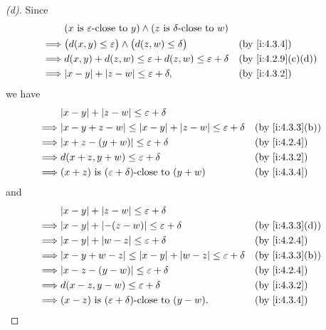 \begin{proof}[(d)]
  Since
  \begin{align*}
             & (x \text{ is \(\varepsilon\)-close to } y) \land (z \text{ is \(\delta\)-close to } w)                        \\
    \implies & \big(d(x, y) \leq \varepsilon\big) \land \big(d(z, w) \leq \delta\big)                 &  & \by{i:4.3.4}      \\
    \implies & d(x, y) + d(z, w) \leq \varepsilon + d(z, w) \leq \varepsilon + \delta                 &  & \by{i:4.2.9}[c,d] \\
    \implies & \abs{x - y} + \abs{z - w} \leq \varepsilon + \delta,                                   &  & \by{i:4.3.2}
  \end{align*}
  we have
  \begin{align*}
             & \abs{x - y} + \abs{z - w} \leq \varepsilon + \delta                                               \\
    \implies & \abs{x - y + z - w} \leq \abs{x - y} + \abs{z - w} \leq \varepsilon + \delta &  & \by{i:4.3.3}[b] \\
    \implies & \abs{x + z - (y + w)} \leq \varepsilon + \delta                              &  & \by{i:4.2.4}    \\
    \implies & d(x + z, y + w) \leq \varepsilon + \delta                                    &  & \by{i:4.3.2}    \\
    \implies & (x + z) \text{ is \((\varepsilon + \delta)\)-close to } (y + w)              &  & \by{i:4.3.4}
  \end{align*}
  and
  \begin{align*}
             & \abs{x - y} + \abs{z - w} \leq \varepsilon + \delta                                               \\
    \implies & \abs{x - y} + \abs{-(z - w)} \leq \varepsilon + \delta                       &  & \by{i:4.3.3}[d] \\
    \implies & \abs{x - y} + \abs{w - z} \leq \varepsilon + \delta                          &  & \by{i:4.2.4}    \\
    \implies & \abs{x - y + w - z} \leq \abs{x - y} + \abs{w - z} \leq \varepsilon + \delta &  & \by{i:4.3.3}[b] \\
    \implies & \abs{x - z - (y - w)} \leq \varepsilon + \delta                              &  & \by{i:4.2.4}    \\
    \implies & d(x - z, y - w) \leq \varepsilon + \delta                                    &  & \by{i:4.3.2}    \\
    \implies & (x - z) \text{ is \((\varepsilon + \delta)\)-close to } (y - w).             &  & \by{i:4.3.4}
  \end{align*}
\end{proof}

